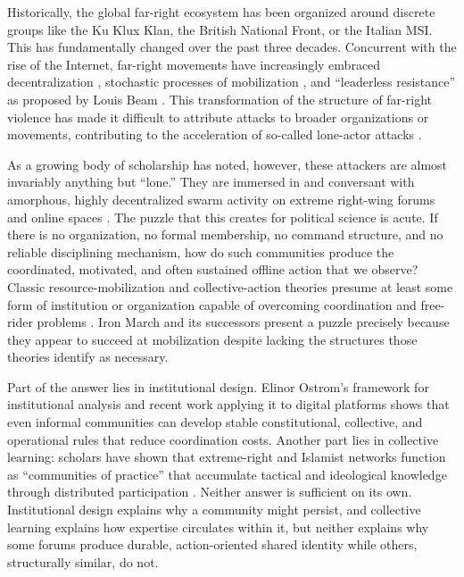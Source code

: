 \documentclass[bibtex,autowc,nonblind]{apsr_submission}
\begin{document}
Historically, the global far-right ecosystem has been organized around discrete groups like the Ku Klux Klan, the British National Front, or the Italian MSI. This has fundamentally changed over the past three decades. Concurrent with the rise of the Internet, far-right movements have increasingly embraced decentralization \citep{furstenberg2024decentralized, newhouse2021threat}, stochastic processes of mobilization \citep{conway2019right, amman2021stochastic}, and ``leaderless resistance'' as proposed by Louis Beam \citep{beam1992leaderless, kaplan1997leaderless}. This transformation of the structure of far-right violence has made it difficult to attribute attacks to broader organizations or movements, contributing to the acceleration of so-called lone-actor attacks \citep{gill2014bombing, ravndal2016right}.

As a growing body of scholarship has noted, however, these attackers are almost invariably anything but ``lone.'' They are immersed in and conversant with amorphous, highly decentralized swarm activity on extreme right-wing forums and online spaces \citep{tornberg2024echo, upchurch, kasimov2023decentralized, scrivens2023}. The puzzle that this creates for political science is acute. If there is no organization, no formal membership, no command structure, and no reliable disciplining mechanism, how do such communities produce the coordinated, motivated, and often sustained offline action that we observe? Classic resource-mobilization and collective-action theories presume at least some form of institution or organization capable of overcoming coordination and free-rider problems \citep{olson1971logic, mccarthy1977resource, tilly2017mobilization}. Iron March and its successors present a puzzle precisely because they appear to succeed at mobilization despite lacking the structures those theories identify as necessary.

Part of the answer lies in institutional design. Elinor Ostrom's framework for institutional analysis and recent work applying it to digital platforms \citep{ostrom1990governing, ostrom2004quest, frey2019_part, schneider} shows that even informal communities can develop stable constitutional, collective, and operational rules that reduce coordination costs. Another part lies in collective learning: scholars have shown that extreme-right and Islamist networks function as ``communities of practice'' that accumulate tactical and ideological knowledge through distributed participation \citep{kenney2020community, lee2022, furstenberg2024decentralized}. Neither answer is sufficient on its own. Institutional design explains why a community might persist, and collective learning explains how expertise circulates within it, but neither explains why some forums produce durable, action-oriented shared identity while others, structurally similar, do not.
\end{document}
